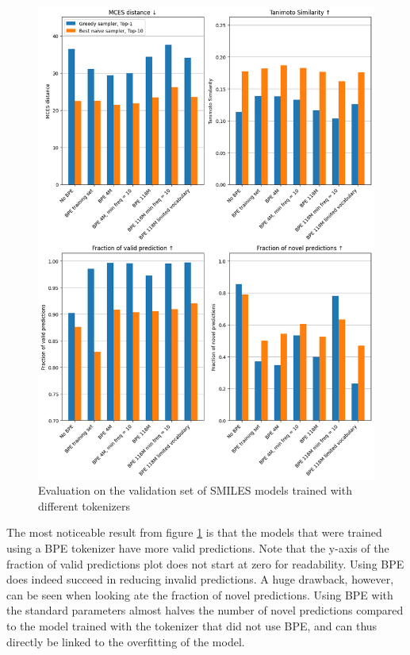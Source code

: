 \begin{figure}[h]
    \centering
    \includegraphics[width=1.0\textwidth]{figures/results/bpe_with_tanimoto.png}
    \caption{Evaluation on the validation set of SMILES models trained with different tokenizers}
    \label{fig:bpe}
\end{figure}

The most noticeable result from figure \ref{fig:bpe} is that the models that were trained using a BPE tokenizer have more valid predictions.
Note that the y-axis of the fraction of valid predictions plot does not start at zero for readability.
Using \ac{BPE} does indeed succeed in reducing invalid predictions.
A huge drawback, however, can be seen when looking ate the fraction of novel predictions.
Using \ac{BPE} with the standard parameters almost halves the number of novel predictions compared to the model trained with the tokenizer that did not use \ac{BPE},
and can thus directly be linked to the overfitting of the model.

